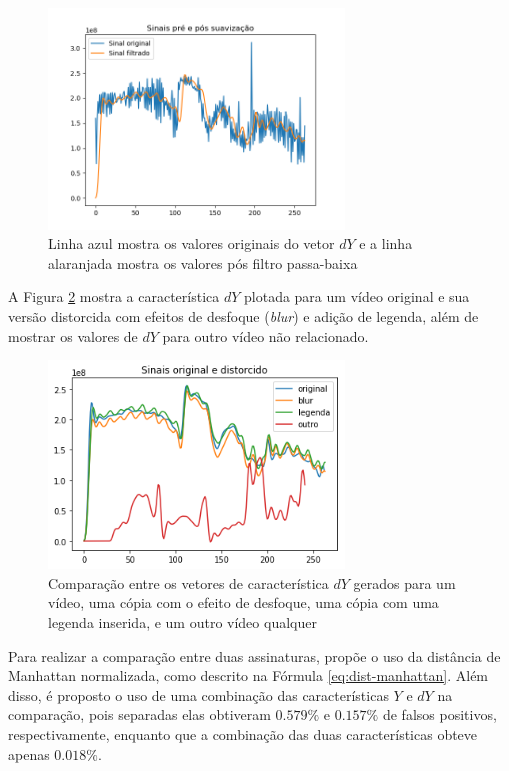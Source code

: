 \begin{figure}[h]
  \includegraphics[width=0.7\textwidth]{dados/figuras/filtro_passa_baixa}
  \caption{Linha azul mostra os valores originais do vetor $dY$ e a linha alaranjada mostra os valores pós filtro passa-baixa}
  \label{fig:framediff-passa-baixa}
\end{figure}


A Figura \ref{fig:framediff-comparacao} mostra a característica $dY$ plotada para um vídeo original e sua versão distorcida com efeitos de desfoque (\textit{blur}) e adição de legenda, além de mostrar os valores de $dY$ para outro vídeo não relacionado.

\begin{figure}[h]
  \includegraphics[width=0.7\textwidth]{dados/figuras/dy}
  \caption{Comparação entre os vetores de característica $dY$ gerados para um vídeo, uma cópia com o efeito de desfoque, uma cópia com uma legenda inserida, e um outro vídeo qualquer}
  \label{fig:framediff-comparacao}
\end{figure}


Para realizar a comparação entre duas assinaturas, \citeauthor{cook2011efficient} propõe o uso da distância de Manhattan normalizada, como descrito na Fórmula \ref{eq:dist-manhattan}. Além disso, é proposto o uso de uma combinação das características $Y$ e $dY$ na comparação, pois separadas elas obtiveram $0.579\%$ e $0.157\%$ de falsos positivos, respectivamente, enquanto que a combinação das duas características obteve apenas $0.018\%$. 

